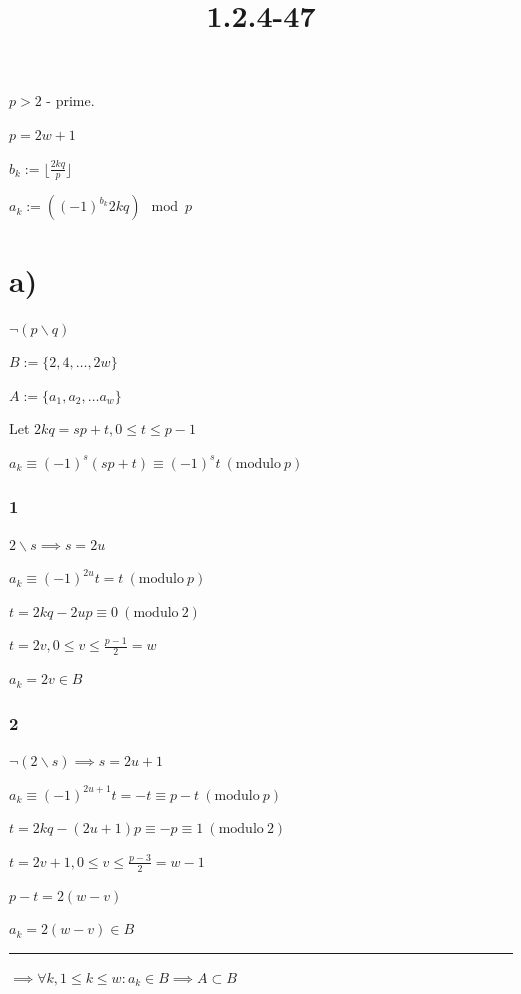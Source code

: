 \documentclass{article}
\title{1.2.4-47}
\begin{document}
\maketitle

\( p > 2 \) - prime.

\( p = 2 w + 1 \)

\( b_k := \lfloor{\frac{2kq}{p}}\rfloor \)

\( a_k := ((-1)^{b_k} 2kq) \mod p \)

\section*{a)}

\( \lnot(p \backslash q) \)

\( B := \{ 2, 4, \ldots, 2w \} \)

\( A := \{ a_1, a_2, \ldots a_w \} \)

Let \( 2kq = sp + t, 0 \leq t \leq p - 1 \)

\( a_k \equiv (-1)^s(sp+t) \equiv (-1)^s t \ (\mathrm{modulo}\ p) \)

\subsubsection*{1}

\( 2 \backslash s \implies s = 2u \)

\( a_k \equiv (-1)^{2u} t = t \ (\mathrm{modulo}\ p) \)

\( t = 2kq - 2up \equiv 0 \ (\mathrm{modulo}\ 2) \)

\( t = 2v, 0 \leq v \leq \frac{p-1}{2} = w \)

\( a_k = 2v \in B \)

\subsubsection*{2}

\( \lnot(2 \backslash s) \implies s = 2u + 1 \)

\( a_k \equiv (-1)^{2u+1} t = -t \equiv p - t \ (\mathrm{modulo}\ p) \)

\( t = 2kq - (2u+1)p \equiv -p \equiv 1 \ (\mathrm{modulo}\ 2) \)

\( t = 2v + 1, 0 \leq v \leq \frac{p-3}{2} = w - 1 \)

\( p - t = 2 (w - v) \)

\( a_k = 2(w-v) \in B \)

\bigskip\hrule\bigskip

\( \implies \forall k, 1 \leq k \leq w: a_k \in B \implies A \subset B \)
\end{document}
